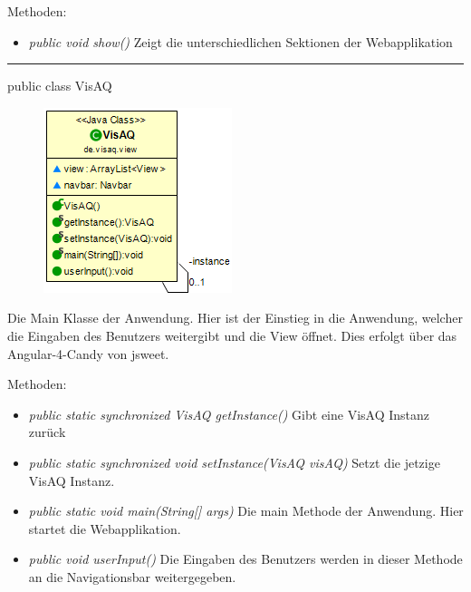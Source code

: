 Methoden:
\begin{itemize} 
    \item \emph{public void show()} Zeigt die unterschiedlichen Sektionen der Webapplikation
\end{itemize}

\rule{\textwidth}{0.4pt} 
public class VisAQ

\begin{minipage}{0.3\textwidth}
    \begin{figure}[H]
        \includegraphics[scale = 0.6]{media/frontend/view/de.view/VisAQ_Class.png}
    \end{figure}
    \end{minipage} \hfill
    \begin{minipage}{0.6\textwidth}
Die Main Klasse der Anwendung. Hier ist der Einstieg in die Anwendung, welcher die Eingaben des Benutzers weitergibt und die View öffnet. Dies erfolgt über das \gls{Angular-4-Candy} von jsweet.
\end{minipage}

Methoden:
\begin{itemize} 
    \item \emph{public static synchronized VisAQ getInstance()} Gibt eine VisAQ Instanz zurück
    \item \emph{public static synchronized void setInstance(VisAQ visAQ)} Setzt die jetzige VisAQ Instanz.
    \item \emph{public static void main(String[] args)} Die main Methode der Anwendung. Hier startet die Webapplikation.
    \item \emph{public void userInput()} Die Eingaben des Benutzers werden in dieser Methode an die Navigationsbar weitergegeben.
\end{itemize} 